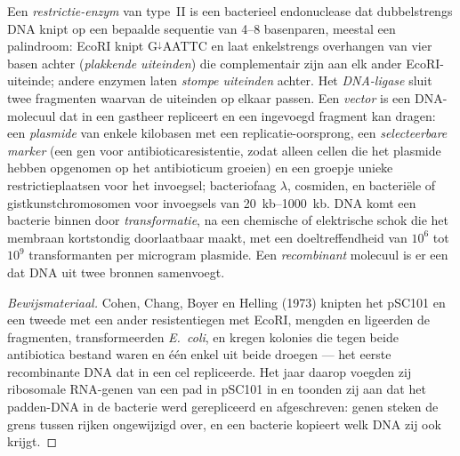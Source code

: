\begin{definition}\label{def:b3:genetic-engineering:tools}
Een \emph{restrictie-enzym} van type~II is een bacterieel endonuclease
dat dubbelstrengs DNA knipt op een bepaalde sequentie van
\numrange{4}{8} basenparen, meestal een palindroom: EcoRI knipt
G$^{\downarrow}$AATTC en laat enkelstrengs overhangen van vier basen
achter (\emph{plakkende uiteinden}) die complementair zijn aan elk
ander EcoRI-uiteinde; andere enzymen laten \emph{stompe uiteinden}
achter. Het \emph{DNA-ligase} sluit twee fragmenten waarvan de
uiteinden op elkaar passen. Een \emph{vector} is een DNA-molecuul dat
in een gastheer repliceert en een ingevoegd fragment kan dragen: een
\emph{plasmide} van enkele kilobasen met een replicatie-oorsprong, een
\emph{selecteerbare marker} (een gen voor antibioticaresistentie, zodat
alleen cellen die het plasmide hebben opgenomen op het antibioticum
groeien) en een groepje unieke restrictieplaatsen voor het invoegsel;
bacteriofaag $\lambda$, cosmiden, en bacteriële of gistkunstchromosomen
voor invoegsels van \qtyrange{20}{1000}{kb}. DNA komt een bacterie
binnen door \emph{transformatie}, na een chemische of elektrische schok
die het membraan kortstondig doorlaatbaar maakt, met een
doeltreffendheid van $10^{6}$ tot $10^{9}$ transformanten per microgram
plasmide. Een \emph{recombinant} molecuul is er een dat DNA uit twee
bronnen samenvoegt.
\end{definition}

\begin{proof}[Bewijsmateriaal]
Cohen, Chang, Boyer en Helling (1973) knipten het  pSC101 en
een tweede  met een ander resistentiegen met EcoRI, mengden en
ligeerden de fragmenten, transformeerden \emph{E.~coli}, en kregen
kolonies die tegen beide antibiotica bestand waren en één enkel
 uit beide droegen --- het eerste recombinante DNA dat in een
cel repliceerde. Het jaar daarop voegden zij ribosomale RNA-genen van
een pad in pSC101 in en toonden zij aan dat het padden-DNA in de
bacterie werd gerepliceerd en afgeschreven: genen steken de grens
tussen rijken ongewijzigd over, en een bacterie kopieert welk DNA zij
ook krijgt.
\end{proof}

